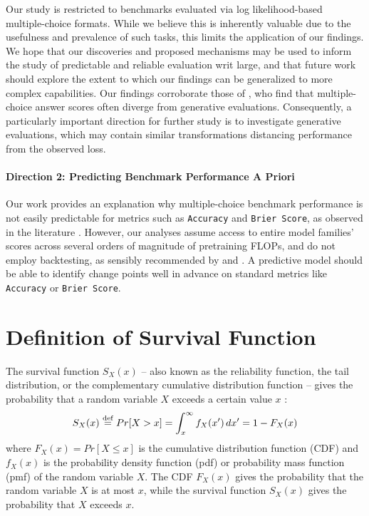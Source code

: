 Our study is restricted to benchmarks evaluated via log likelihood-based multiple-choice formats. While we believe this is inherently valuable due to the usefulness and prevalence of such tasks, this limits the application of our findings. We hope that our discoveries and proposed mechanisms may be used to inform the study of predictable and reliable evaluation writ large, and that future work should explore the extent to which our findings can be generalized to more complex capabilities. Our findings corroborate those of \citet{lyu2024beyondprobabilities}, who find that multiple-choice answer scores often diverge from generative evaluations. Consequently, a particularly important direction for further study is to investigate generative evaluations, which may contain similar transformations distancing performance from the observed loss.

\paragraph{Direction 2: Predicting Benchmark Performance A Priori}

Our work provides an explanation why multiple-choice benchmark performance is not easily predictable for metrics such as \texttt{Accuracy} and \texttt{Brier Score}, as observed in the literature \citep{du2024understanding}. However, our analyses assume access to entire model families' scores across several orders of magnitude of pretraining FLOPs, and do not employ backtesting, as sensibly recommended by \citet{alabdulmohsin2022revisitingneuralscalinglaws} and \citet{owen2024predicting}. A predictive model should be able to identify change points well in advance on standard metrics like \texttt{Accuracy} or \texttt{Brier Score}.


\section{Definition of Survival Function}
\label{app:sec:survival_function}

The survival function $S_X(x)$ -- also known as the reliability function, the tail distribution, or the complementary cumulative distribution function -- gives the probability that a random variable $X$ exceeds a certain value $x$ \cite{kleinbaum2012survival, wikipedia_2023_survival_function}:
\begin{equation}
S_X(x) \operatorname{\stackrel{\text{def}}{\;=\;}} Pr[X > x] = \int_{x}^{\infty} f_X(x') \, dx' = 1 - F_X(x)
\label{eqn:survival_function}
\end{equation}
where $F_X(x) = Pr[X \leq x]$ is the cumulative distribution function (CDF) and $f_X(x)$ is the probability density function (pdf) or probability mass function (pmf) of the random variable $X$.
The CDF $F_X(x)$ gives the probability that the random variable $X$ is at most $x$, while the survival function $S_X(x)$ gives the probability that $X$ exceeds $x$.

